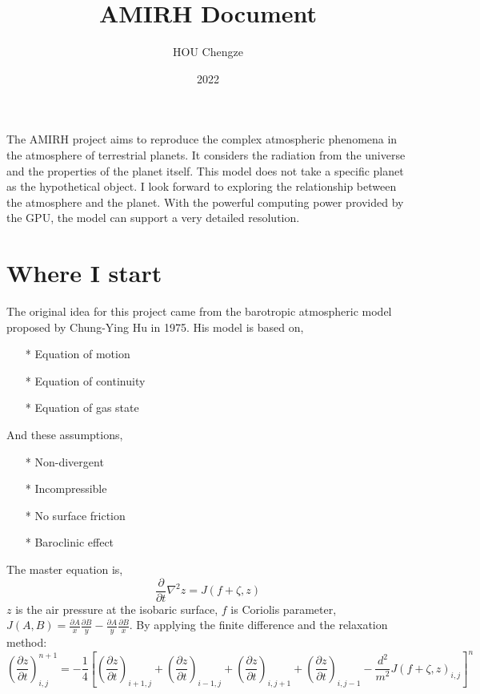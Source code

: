 \documentclass{article}
\title{AMIRH Document}
\author{HOU Chengze}
\date{2022}
\begin{document}
 
\maketitle
The AMIRH project aims to reproduce the complex atmospheric phenomena in the atmosphere of terrestrial planets. 
It considers the radiation from the universe and the properties of the planet itself. 
This model does not take a specific planet as the hypothetical object. I look forward to exploring the relationship between the atmosphere and the planet. 
With the powerful computing power provided by the GPU, the model can support a very detailed resolution.

\section{Where I start}
The original idea for this project came from the barotropic atmospheric model proposed by Chung-Ying Hu in 1975. 
His model is based on,\newline
\begin{itemize}
    \item [*] Equation of motion
    \item [*] Equation of continuity
    \item [*] Equation of gas state
\end{itemize}
And these assumptions,\newline
\begin{itemize}
    \item [*] Non-divergent
    \item [*] Incompressible
    \item [*] No surface friction
    \item [*] Baroclinic effect
\end{itemize}
The master equation is,
\begin{equation}
    \frac{\partial}{\partial{t}}\nabla^{2}z=J(f+\zeta, z)
\end{equation}
$z$ is the air pressure at the isobaric surface, $f$ is Coriolis parameter, $J(A, B)=\frac{\partial A}{x}\frac{\partial B}{y}-\frac{\partial A}{y}\frac{\partial B}{x}$.
By applying the finite difference and the relaxation method:\newline
\begin{equation}
    (\frac{\partial{z}}{\partial{t}})^{n+1}_{i,j}
    =-\frac{1}{4}
        [
            (\frac{\partial{z}}{\partial{t}})_{i+1,j}+
            (\frac{\partial{z}}{\partial{t}})_{i-1,j}+
            (\frac{\partial{z}}{\partial{t}})_{i,j+1}+
            (\frac{\partial{z}}{\partial{t}})_{i,j-1}-
            \frac{d^2}{m^2}J(f+\zeta, z)_{i,j}
        ]^n
\end{equation}
\end{document}
